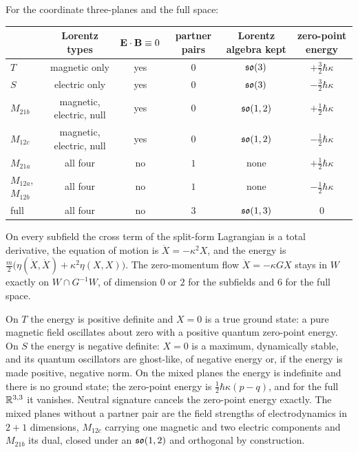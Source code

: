 \begin{theorem}
\label{thm:subfs}
For the coordinate three-planes and the full space:
\begin{center}
\footnotesize\upshape
\setlength{\tabcolsep}{4pt}
\begin{tabular}{@{}lccccc@{}}
\toprule
 & Lorentz types & $\mathbf E\cdot\mathbf B\equiv0$ & partner pairs & Lorentz algebra kept & zero-point energy\\
\midrule
$T$ & magnetic only & yes & $0$ & $\mathfrak{so}(3)$ & $+\tfrac32\hbar\kappa$\\
$S$ & electric only & yes & $0$ & $\mathfrak{so}(3)$ & $-\tfrac32\hbar\kappa$\\
$M_{21b}$ & magnetic, electric, null & yes & $0$ & $\mathfrak{so}(1,2)$ & $+\tfrac12\hbar\kappa$\\
$M_{12c}$ & magnetic, electric, null & yes & $0$ & $\mathfrak{so}(1,2)$ & $-\tfrac12\hbar\kappa$\\
$M_{21a}$ & all four & no & $1$ & none & $+\tfrac12\hbar\kappa$\\
$M_{12a}$, $M_{12b}$ & all four & no & $1$ & none & $-\tfrac12\hbar\kappa$\\
full & all four & no & $3$ & $\mathfrak{so}(1,3)$ & $0$\\
\bottomrule
\end{tabular}
\end{center}
On every subfield the cross term of the split-form Lagrangian is a total derivative, the equation of motion is $\ddot X=-\kappa^2X$, and the
energy is $\tfrac m2\bigl(\eta(\dot X,\dot X)+\kappa^2\eta(X,X)\bigr)$. The zero-momentum flow $\dot X=-\kappa GX$ stays in $W$ exactly on
$W\cap G^{-1}W$, of dimension $0$ or $2$ for the subfields and $6$ for the full space.
\end{theorem}

On $T$ the energy is positive definite and $X=0$ is a true ground state: a pure magnetic field oscillates about zero with a positive quantum
zero-point energy. On $S$ the energy is negative definite: $X=0$ is a maximum, dynamically stable, and its quantum oscillators are ghost-like,
of negative energy or, if the energy is made positive, negative norm. On the mixed planes the energy is indefinite and there is no ground
state; the zero-point energy is $\tfrac12\hbar\kappa(p-q)$, and for the full $\mathbb{R}^{3,3}$ it vanishes. Neutral signature cancels the zero-point
energy exactly. The mixed planes without a partner pair are the field strengths of electrodynamics in $2{+}1$ dimensions, $M_{12c}$ carrying one
magnetic and two electric components and $M_{21b}$ its dual, closed under an $\mathfrak{so}(1,2)$ and orthogonal by construction.

